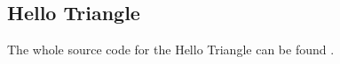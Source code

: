 \subsection{Hello Triangle}

The whole source code for the Hello Triangle can be found \href{https://learnopengl.com/code_viewer_gh.php?code=src/1.getting_started/2.1.hello_triangle/hello_triangle.cpp}{}.